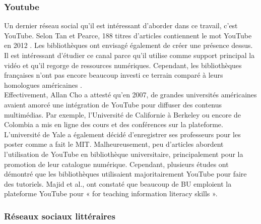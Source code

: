 \documentclass[a4paper,11pt]{article} %
\begin{document}
\subsubsection{Youtube}
Un dernier réseau social qu’il est intéressant d’aborder dans ce travail, c’est YouTube. Selon Tan et Pearce, 188 titres d’articles contiennent le mot YouTube en 2012 \citep{cho2013youtube,}. Les bibliothèques ont envisagé également de créer une présence dessus. Il est intéressant d’étudier ce canal parce qu’il utilise comme support principal la vidéo et qu’il regorge de ressources numériques. Cependant, les bibliothèques françaises n’ont pas encore beaucoup investi ce 
terrain comparé à leurs homologues américaines \citep{cho2013youtube,}.\\
Effectivement, Allan Cho a attesté qu’en 2007, de grandes universités américaines avaient amorcé une intégration de YouTube pour diffuser des contenus multimédias. Par exemple, l’Université de Californie à Berkeley ou encore de Colombia a mis en ligne des cours et des conférences sur la plateforme. L’université de Yale a également décidé d’enregistrer ses professeurs pour les poster comme a fait le MIT.\citep{cho2013youtube,} Malheureusement, peu d’articles abordent l’utilisation de YouTube en bibliothèque universitaire, principalement pour la promotion de leur catalogue numérique. Cependant, plusieurs études ont démontré que les bibliothèques utilisaient majoritairement YouTube pour faire des tutoriels. Majid et al., ont constaté que 
beaucoup de BU emploient la plateforme YouTube pour « for teaching information literacy skills ». \citep{majid2012analysis,}

\subsubsection{Réseaux sociaux littéraires}
\end{document}
